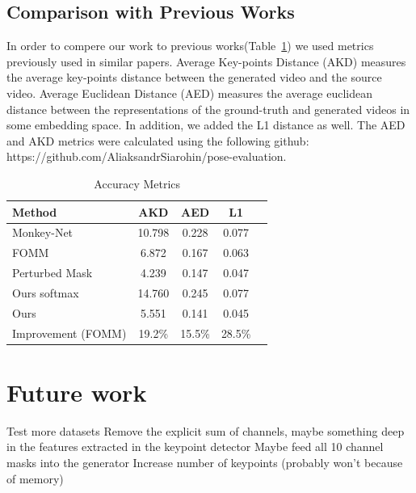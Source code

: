 \documentclass{article}
\begin{document}
\subsection{Comparison with Previous Works}
In order to compere our work to previous works(Table~\ref{table:results}) we used metrics previously used in similar papers. Average Key-points Distance \cite{cao2017realtime} (AKD) measures the average key-points distance between the generated video and the source video. Average Euclidean Distance \cite{zheng2019joint}  (AED) measures the average euclidean distance
 between the representations of the ground-truth and generated videos in some embedding space. In addition, we added the L1 distance as well. The AED and AKD metrics were calculated using the following github: https://github.com/AliaksandrSiarohin/pose-evaluation.



\begin{table}[t]
\caption{Accuracy Metrics}
\label{table:results}
\vskip 0.15in
\begin{center}
\begin{small}
\begin{sc}
\begin{tabular}{lcccr}
\toprule
Method & AKD & AED & L1 \\
\midrule
Monkey-Net    & 10.798 & 0.228 & 0.077 \\
FOMM    & 6.872 & 0.167 & 0.063 \\
Perturbed Mask & 4.239 & 0.147 & 0.047 \\
Ours softmax & 14.760& 0.245 & 0.077 \\
Ours & 5.551 & 0.141 &  0.045\\
\midrule
Improvement (FOMM)    & 19.2\% & 15.5\% & 28.5\% \\
\bottomrule
\end{tabular}
\end{sc}
\end{small}
\end{center}
\vskip -0.1in
\end{table}
\section{Future work}
Test more datasets
Remove the explicit sum of channels, maybe something deep in the features
extracted in the keypoint detector
Maybe feed all 10 channel masks into the generator
Increase number of keypoints (probably won't because of memory)
\end{document}
